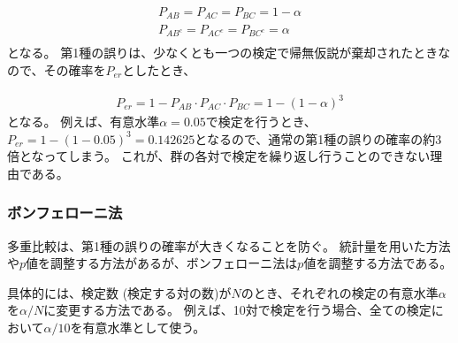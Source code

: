\documentclass[titlepage,12pt]{jreport}
\begin{document}
\begin{eqnarray}
	P_{AB} = P_{AC} = P_{BC} = 1 - \alpha \\
	P_{AB^{c}} = P_{AC^{c}} = P_{BC^{c}} = \alpha \nonumber \\
\end{eqnarray}
となる。 第1種の誤りは、少なくとも一つの検定で帰無仮説が棄却されたときなので、その確率を$P_{er}$としたとき、

\begin{eqnarray}
	P_{er} = 1 - P_{AB} \cdot P_{AC} \cdot P_{BC} = 1 - (1 - \alpha)^{3}
\end{eqnarray}
となる。 例えば、有意水準$\alpha = 0.05$で検定を行うとき、$P_{er} = 1 - (1 - 0.05)^{3} = 0.142625$となるので、通常の第1種の誤りの確率の約3倍となってしまう。 これが、群の各対で検定を繰り返し行うことのできない理由である。

\subsubsection{ボンフェローニ法}
多重比較は、第1種の誤りの確率が大きくなることを防ぐ。 統計量を用いた方法や$p$値を調整する方法があるが、ボンフェローニ法は$p$値を調整する方法である。

具体的には、検定数 (検定する対の数)が$N$のとき、それぞれの検定の有意水準$\alpha$を$\alpha/N$に変更する方法である。 例えば、10対で検定を行う場合、全ての検定において$\alpha/10$を有意水準として使う。
\end{document}
